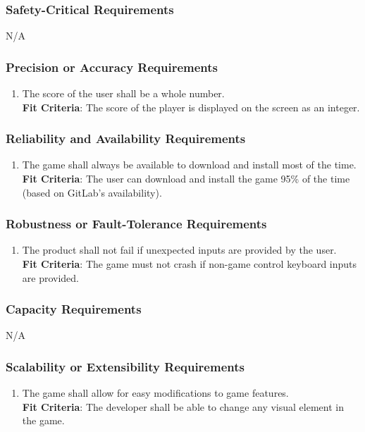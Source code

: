 \documentclass[12pt, titlepage]{article}
\begin{document}
\subsubsection{Safety-Critical Requirements}
N/A

\subsubsection{Precision or Accuracy Requirements}
\begin{enumerate}[leftmargin=1.45cm, label={PR \arabic*}]
    \item The score of the user shall be a whole number.\\
    \textbf{Fit Criteria}: The score of the player is displayed on the screen as an integer.
\end{enumerate}

\subsubsection{Reliability and Availability Requirements}
\begin{enumerate}[leftmargin=1.45cm,label={PR \arabic*}]
    \item The game shall always be available to download and install most of the time.\\
    \textbf{Fit Criteria}: The user can download and install the game 95\% of the time (based on GitLab's availability). 
\end{enumerate}

\subsubsection{Robustness or Fault-Tolerance Requirements}
\begin{enumerate}[leftmargin=1.45cm, label={PR \arabic*}]
    \item The product shall not fail if unexpected inputs are provided by the user.\\
    \textbf{Fit Criteria}: The game must not crash if non-game control keyboard inputs are provided.
\end{enumerate}

\subsubsection{Capacity Requirements}
N/A

\subsubsection{Scalability or Extensibility Requirements}
\begin{enumerate}[leftmargin=1.45cm,label={PR \arabic*}]
    \item The game shall allow for easy modifications to game features. \\
    \textbf{Fit Criteria}: The developer shall be able to change any visual element in the game.
\end{enumerate}
\end{document}
